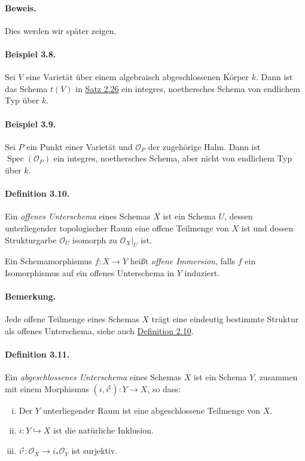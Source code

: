 \paragraph{Beweis.} Dies werden wir später zeigen.

\paragraph{Beispiel 3.8.}\label{3.8} Sei $V$ eine Varietät über einem algebraisch abgeschlossenen Körper $k$. Dann ist das Schema $t(V)$ in \hyperref[2.26]{Satz 2.26} ein integres, noethersches Schema von endlichem Typ über $k$.

\paragraph{Beispiel 3.9.}\label{3.9} Sei $P$ ein Punkt einer Varietät und $\mathcal{O}_P$ der zugehörige Halm. Dann ist $\operatorname{Spec}(\mathcal{O}_P)$ ein integres, noethersches Schema, aber nicht von endlichem Typ über $k$.

\paragraph{Definition 3.10.}\label{3.10} Ein \textit{offenes Unterschema} eines Schemas $X$ ist ein Schema $U$, dessen unterliegender topologischer Raum eine offene Teilmenge von $X$ ist und dessen Strukturgarbe $\mathcal{O}_U$ isomorph zu $\mathcal{O}_X|_U$ ist.

Ein Schemamorphismus $f:X\to Y$ heißt \textit{offene Immersion}, falls $f$ ein Isomorphismus auf ein offenes Unterschema in $Y$ induziert.

\paragraph{Bemerkung.} Jede offene Teilmenge eines Schemas $X$ trägt eine eindeutig bestimmte Struktur als offenes Unterschema, siehe auch \hyperref[2.10]{Definition 2.10}.

\paragraph{Definition 3.11.}\label{3.11} Ein \textit{abgeschlossenes Unterschema} eines Schemas $X$ ist ein Schema $Y$, zusammen mit einem Morphismus $(i,i^\sharp):Y\to X$, so dass:
\begin{enumerate}[(i)]
\item Der $Y$ unterliegender Raum ist eine abgeschlossene Teilmenge von $X$.
\item $i:Y\hookrightarrow X$ ist die natürliche Inklusion.
\item $i^\sharp:\mathcal{O}_X\to i_\ast\mathcal{O}_Y$ ist surjektiv.
\end{enumerate}

